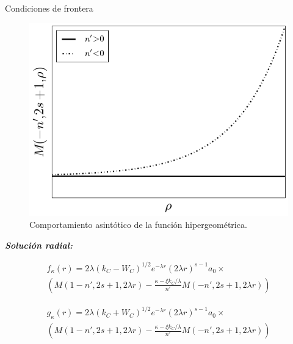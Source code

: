 \documentclass{beamer}
\begin{document}
\begin{frame}{Condiciones de frontera}
\begin{figure}[H]
\centering
\includegraphics[scale=0.4]{../doc/hypgeo.png}
\caption{Comportamiento asint\'otico de la funci\'on hipergeom\'etrica.}
\label{fig:hypgeo}
\end{figure}  
\end{frame}

\begin{frame}{\textit{\textbf{Soluci\'on radial:}}}

\begin{equation}
\begin{split}
f_{\kappa}(r)=2\lambda (k_C -W_C)^{1/2}e^{-\lambda r}(2\lambda r)^{s-1}a_0 \times \\
\left( M(1-n',2s+1,2\lambda r) - \frac{\kappa-\xi k_C /\lambda}{n'} M(-n',2s+1,2\lambda r) \right)
\end{split}
\end{equation}

\begin{equation}
\begin{split}
g_{\kappa}(r)=2\lambda (k_C +W_C)^{1/2}e^{-\lambda r}(2\lambda r)^{s-1}a_0 \times \\
\left( M(1-n',2s+1,2\lambda r) - \frac{\kappa-\xi k_C /\lambda}{n'} M(-n',2s+1,2\lambda r) \right)
\end{split}
\end{equation}
\end{frame}
\end{document}
